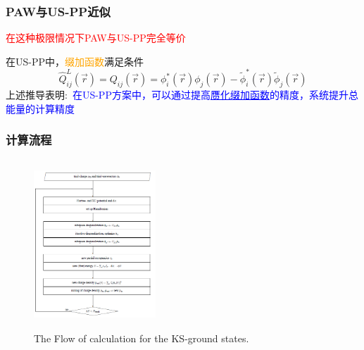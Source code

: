 \documentclass[cjk,slidestop,compress,mathserif,blue]{beamer}
\begin{document}
\frame
{
	\frametitle{\textrm{PAW}与\textrm{US-PP}近似}
	\textcolor{red}{在这种极限情况下\textrm{PAW}与\textrm{US-PP}完全等价}

	在\textrm{US-PP}中，\textcolor{orange}{缀加函数}满足条件
	$$\hat Q_{ij}^L(\vec r)=Q_{ij}(\vec r)=\phi_i^{\ast}(\vec r)\phi_j(\vec r)-\tilde\phi_i^{\ast}(\vec r)\tilde\phi_j(\vec r)$$
	上述推导表明:~\textcolor{blue}{在\textrm{US-PP}方案中，可以通过提高\underline{赝化缀加函数}的精度，系统提升总能量的计算精度}
}

\frame
{
	\frametitle{计算流程}
\begin{figure}[h!]
	\vspace{-0.2in}
\centering
\includegraphics[height=2.5in,width=1.8in,viewport=0 0 480 630,clip]{Figures/VASP_procedure.png}
\caption{\tiny \textrm{The Flow of calculation for the KS-ground states.}}%
\label{PAW_baiseset}
\end{figure} 
}
\end{document}
